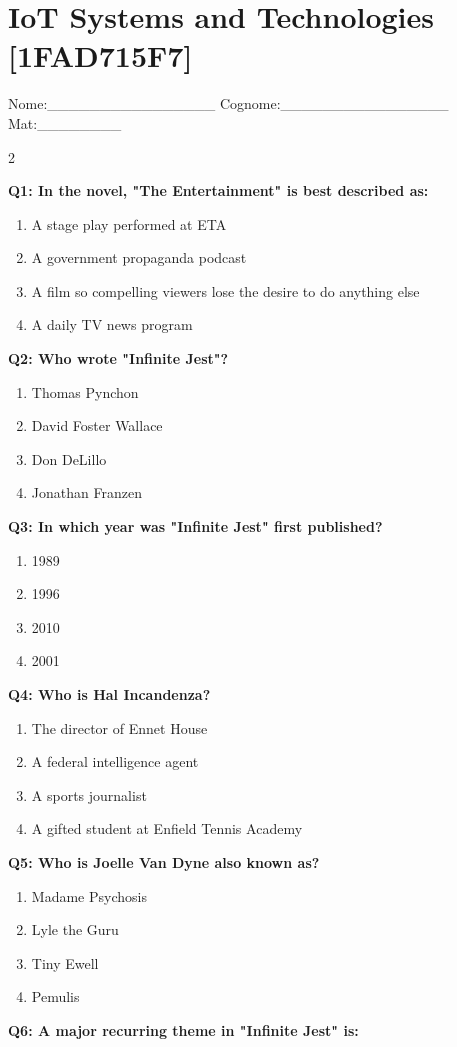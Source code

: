 \documentclass[10pt]{article}
\begin{document}
\section*{IoT Systems and Technologies \footnotesize [1FAD715F7]}
{\footnotesize Nome:\_\_\_\_\_\_\_\_\_\_\_\_\_\_\_\_ Cognome:\_\_\_\_\_\_\_\_\_\_\_\_\_\_\_\_ Mat:\_\_\_\_\_\_\_\_}
\begin{multicols}{2}

\textbf{Q1: In the novel, "The Entertainment" is best described as:}

\begin{enumerate}[label=\arabic*.]
\item A stage play performed at ETA
\item A government propaganda podcast
\item A film so compelling viewers lose the desire to do anything else
\item A daily TV news program
\end{enumerate}
\textbf{Q2: Who wrote "Infinite Jest"?}

\begin{enumerate}[label=\arabic*.]
\item Thomas Pynchon
\item David Foster Wallace
\item Don DeLillo
\item Jonathan Franzen
\end{enumerate}
\textbf{Q3: In which year was "Infinite Jest" first published?}

\begin{enumerate}[label=\arabic*.]
\item 1989
\item 1996
\item 2010
\item 2001
\end{enumerate}
\textbf{Q4: Who is Hal Incandenza?}

\begin{enumerate}[label=\arabic*.]
\item The director of Ennet House
\item A federal intelligence agent
\item A sports journalist
\item A gifted student at Enfield Tennis Academy
\end{enumerate}
\textbf{Q5: Who is Joelle Van Dyne also known as?}

\begin{enumerate}[label=\arabic*.]
\item Madame Psychosis
\item Lyle the Guru
\item Tiny Ewell
\item Pemulis
\end{enumerate}
\textbf{Q6: A major recurring theme in "Infinite Jest" is:}


\end{multicols}
\end{document}
